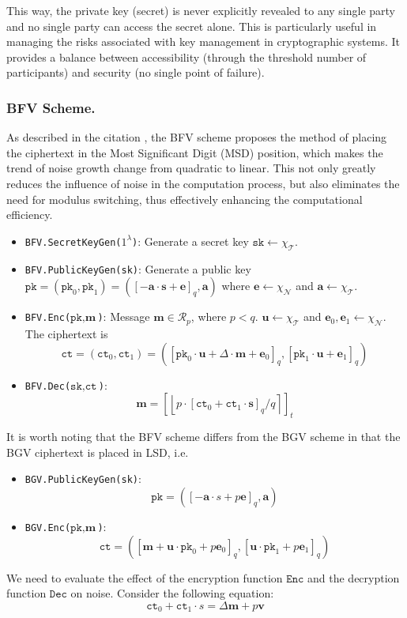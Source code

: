 \documentclass[11pt]{article}
\begin{document}
This way, the private key (secret) is never explicitly revealed to any single party and no single party can access the secret alone.
This is particularly useful in managing the risks associated with key management in cryptographic systems.
It provides a balance between accessibility (through the threshold number of participants) and security (no single point of failure).

\subsubsection{BFV Scheme.}
As described in the citation \cite{10.1007/978-3-642-32009-5_50, cryptoeprint:2012/144}, the BFV scheme proposes the method of placing the ciphertext in the Most Significant Digit (MSD) position, which makes the trend of noise growth change from quadratic to linear. This not only greatly reduces the influence of noise in the computation process, but also eliminates the need for modulus switching, thus effectively enhancing the computational efficiency.

\begin{itemize}
\item \texttt{BFV.SecretKeyGen($1^\lambda$)}: Generate a secret key $\texttt{sk}\leftarrow \chi_\mathcal{T}$.
\item \texttt{BFV.PublicKeyGen(\texttt{sk})}: Generate a public key $\texttt{pk} =(\texttt{pk}_0,\texttt{pk}_1)= \left([-\mathbf{a}\cdot\mathbf{s}+\mathbf{e}]_{q}, \mathbf{a}\right)$ where $\mathbf{e}\leftarrow \chi_\mathcal{N}$ and $\mathbf{a}\leftarrow \chi_\mathcal{T}$.
\item \texttt{BFV.Enc($\texttt{pk},\textbf{m}$)}: Message $\mathbf{m}\in \mathcal{R}_p$, where $p<q$. $\mathbf{u}\leftarrow \chi_\mathcal{T}$ and $\mathbf{e}_0, \mathbf{e}_1\leftarrow \chi_\mathcal{N}$. The ciphertext is $$\texttt{ct} = (\texttt{ct}_0,\texttt{ct}_1)=\left([\texttt{pk}_0\cdot\mathbf{u}+\Delta\cdot\mathbf{m}+\mathbf{e}_0]_{q},[\texttt{pk}_1\cdot\mathbf{u}+\mathbf{e}_1]_{q}\right)$$
\item \texttt{BFV.Dec($\texttt{sk},\texttt{ct}$)}: $$\mathbf{m}=\left[\left\lfloor p\cdot[\texttt{ct}_0+\texttt{ct}_1\cdot\mathbf{s}]_q/q\right\rceil\right]_t$$
\end{itemize}
It is worth noting that the BFV scheme differs from the BGV scheme in that the BGV ciphertext is placed in LSD, i.e.
\begin{itemize}
\item \texttt{BGV.PublicKeyGen(\texttt{sk})}: $$\texttt{pk}=([-\mathbf{a}\cdot{s}+p\mathbf{e}]_q, \mathbf{a})$$
\item \texttt{BGV.Enc($\texttt{pk},\textbf{m}$)}: $$\texttt{ct}=([ \mathbf{m}+\mathbf{u}\cdot\texttt{pk}_0+p\mathbf{e}_0]_q,[\mathbf{u}\cdot\texttt{pk}_1+p\mathbf{e}_1]_q)$$
\end{itemize}
We need to evaluate the effect of the encryption function $\texttt{Enc}$ and the decryption function $\texttt{Dec}$ on noise. Consider the following equation:
\begin{equation}
\texttt{ct}_0+\texttt{ct}_1\cdot{s}=\Delta\mathbf{m}+p\mathbf{v}
\end{equation}
\end{document}
